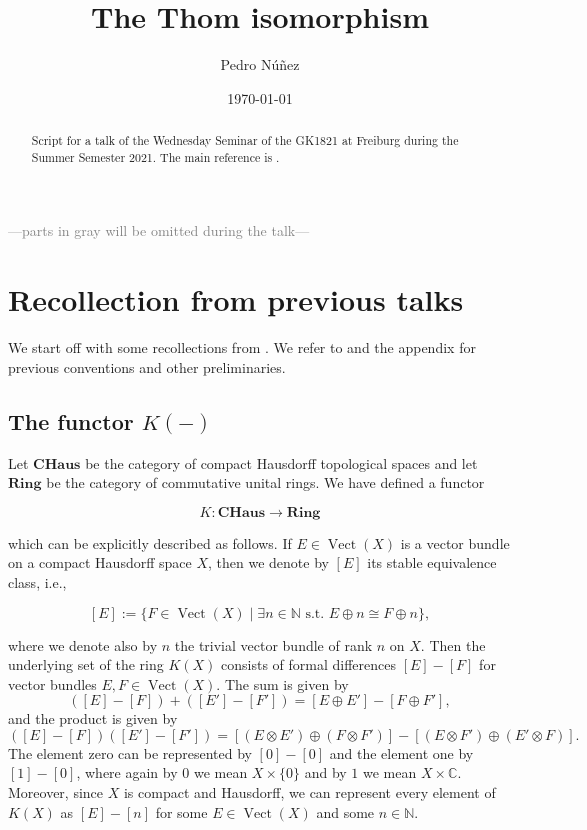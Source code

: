 \documentclass[12pt,a4paper]{amsart}
\title[The Thom isomorphism]{The Thom isomorphism}
\author[Pedro N\'{u}\~{n}ez]{Pedro N\'{u}\~{n}ez}
\date{\today}
\theoremstyle{plain}
\theoremstyle{definition}
\theoremstyle{remark}
\begin{document}
\maketitle

\begin{abstract}
  Script for a talk of the Wednesday Seminar of the GK1821 at Freiburg during the Summer Semester 2021.
  The main reference is \cite[\S 2]{ati67}.
\end{abstract}

\tableofcontents

\begin{center}
  \textcolor{gray}{---parts in gray will be omitted during the talk---}
\end{center}

\section{Recollection from previous talks}

We start off with some recollections from \cite[\S 2]{ati67}.
We refer to \cite{ati67} and the appendix for previous conventions and other preliminaries.

\subsection{The functor $K(-)$ \cite[p.~44]{ati67}}

Let $\mathbf{CHaus}$ be the category of compact Hausdorff topological spaces and let $\mathbf{Ring}$ be the category of commutative unital rings.
We have defined a functor

\[ K \colon \mathbf{CHaus} \to \mathbf{Ring} \]

which can be explicitly described as follows.
If $E \in \operatorname{Vect}(X)$ is a vector bundle on a compact Hausdorff space $X$, then we denote by $[E]$ its stable equivalence class, i.e.,

\[ [E] := \{ F \in \operatorname{Vect}(X) \mid \exists n \in \mathbb{N} \text{ s.t.~} E \oplus n \cong F \oplus n \}, \]

where we denote also by $n$ the trivial vector bundle of rank $n$ on $X$.
Then the underlying set of the ring $K(X)$ consists of formal differences $[E] - [F]$ for vector bundles $E, F \in \operatorname{Vect}(X)$.
The sum is given by
\[ ([E] - [F]) + ([E'] - [F']) = [E \oplus E'] - [F \oplus F'], \]
and the product is given by
\[ ([E] - [F]) ([E'] - [F']) = [(E \otimes E') \oplus (F \otimes F')] - [(E \otimes F') \oplus (E' \otimes F)]. \]
The element zero can be represented by $[0] - [0]$ and the element one by $[1] - [0]$, where again by $0$ we mean $X \times \{0\}$ and by $1$ we mean $X \times \mathbb{C}$.
Moreover, since $X$ is compact and Hausdorff, we can represent every element of $K(X)$ as $[E] - [n]$ for some $E \in \operatorname{Vect}(X)$ and some $n \in \mathbb{N}$.
\end{document}
